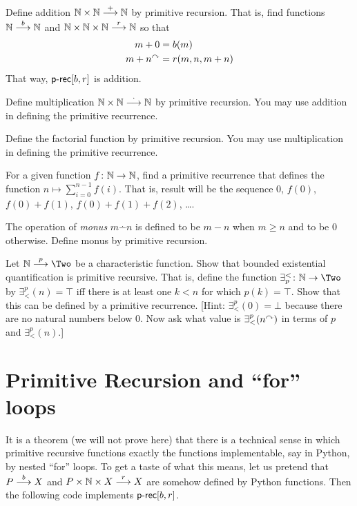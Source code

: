 \begin{exercises}
\begin{firstexercise}
	\item Define addition $\sfromto {+}{\NN\times \NN}\NN$ by primitive recursion. That is, find functions $\sfromto b\NN\NN$ and $\sfromto r{\NN\times\NN\times \NN}\NN$ so that
	\begin{align*}
		m+0 &= b(m)\\
		m+n^\nxt &= r(m,n,m+n)
	\end{align*}
	That way, $\primrec[b,r]$ is addition.
	\item Define multiplication $\sfromto {\cdot}{\NN\times \NN}\NN$ by primitive recursion. You may use addition in defining the primitive recurrence.
	\item Define the factorial function by primitive recursion. You may use multiplication in defining the primitive recurrence.	
	\item For a given function $\fromto f\NN\NN$, find a primitive recurrence that defines the function $n\mapsto \sum_{i=0}^{n-1}f(i)$. That is, result will be the sequence $0$, $f(0)$, $f(0)+f(1)$, $f(0)+f(1)+f(2)$, \ldots.
	\item The operation of \emph{monus} $m\stackrel{.}{-} n$ is defined to be $m-n$ when $m \geq n$ and to be $0$ otherwise. Define monus by primitive recursion.
	\item Let $\sfromto p\NN\Two$ be a characteristic function. Show that bounded existential quantification is primitive recursive. That is, define the function $\fromto {\exists^<_p}\NN\Two$ by $\exists^p_<(n) = \top$ iff there is at least one $k<n$ for which $p(k)=\top$.  Show that this can be defined by a primitive recurrence.
	[Hint: $\exists^p_<(0) = \bot$ because there are no natural numbers below $0$. 
	Now ask what value is $\exists^p_<(n^\nxt)$ in terms of $p$ and $\exists^p_<(n)$.]
\end{firstexercise}
\end{exercises}

\section{Primitive Recursion and ``for'' loops}

It is a theorem (we will not prove here) that there is a technical sense in which primitive recursive functions exactly the functions  implementable, say in Python, by nested ``for'' loops. To get a taste of what this means, let us pretend that $\sfromto bPX$ and $\sfromto r{P\times \NN\times X}X$ are somehow defined by Python functions. Then the following code implements $\primrec[b,r]$.

